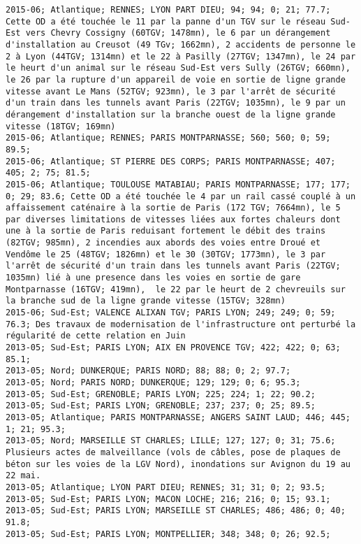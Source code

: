 \documentclass{article}
\begin{document}
\begin{Verbatim}[commandchars=\\\{\}]
2015-06; Atlantique; RENNES; LYON PART DIEU; 94; 94; 0; 21; 77.7; Cette OD a été touchée le 11 par la panne d'un TGV sur le réseau Sud-Est vers Chevry Cossigny (60TGV; 1478mn), le 6 par un dérangement d'installation au Creusot (49 TGv; 1662mn), 2 accidents de personne le 2 à Lyon (44TGV; 1314mn) et le 22 à Pasilly (27TGV; 1347mn), le 24 par le heurt d'un animal sur le réseau Sud-Est vers Sully (26TGV; 660mn), le 26 par la rupture d'un appareil de voie en sortie de ligne grande vitesse avant Le Mans (52TGV; 923mn), le 3 par l'arrêt de sécurité d'un train dans les tunnels avant Paris (22TGV; 1035mn), le 9 par un dérangement d'installation sur la branche ouest de la ligne grande vitesse (18TGV; 169mn)
2015-06; Atlantique; RENNES; PARIS MONTPARNASSE; 560; 560; 0; 59; 89.5; 
2015-06; Atlantique; ST PIERRE DES CORPS; PARIS MONTPARNASSE; 407; 405; 2; 75; 81.5; 
2015-06; Atlantique; TOULOUSE MATABIAU; PARIS MONTPARNASSE; 177; 177; 0; 29; 83.6; Cette OD a été touchée le 4 par un rail cassé couplé à un affaissement caténaire à la sortie de Paris (172 TGV; 7664mn), le 5 par diverses limitations de vitesses liées aux fortes chaleurs dont une à la sortie de Paris reduisant fortement le débit des trains (82TGV; 985mn), 2 incendies aux abords des voies entre Droué et Vendôme le 25 (48TGV; 1826mn) et le 30 (30TGV; 1773mn), le 3 par l'arrêt de sécurité d'un train dans les tunnels avant Paris (22TGV; 1035mn) lié à une presence dans les voies en sortie de gare Montparnasse (16TGV; 419mn),  le 22 par le heurt de 2 chevreuils sur la branche sud de la ligne grande vitesse (15TGV; 328mn)
2015-06; Sud-Est; VALENCE ALIXAN TGV; PARIS LYON; 249; 249; 0; 59; 76.3; Des travaux de modernisation de l'infrastructure ont perturbé la régularité de cette relation en Juin
2013-05; Sud-Est; PARIS LYON; AIX EN PROVENCE TGV; 422; 422; 0; 63; 85.1; 
2013-05; Nord; DUNKERQUE; PARIS NORD; 88; 88; 0; 2; 97.7; 
2013-05; Nord; PARIS NORD; DUNKERQUE; 129; 129; 0; 6; 95.3; 
2013-05; Sud-Est; GRENOBLE; PARIS LYON; 225; 224; 1; 22; 90.2; 
2013-05; Sud-Est; PARIS LYON; GRENOBLE; 237; 237; 0; 25; 89.5; 
2013-05; Atlantique; PARIS MONTPARNASSE; ANGERS SAINT LAUD; 446; 445; 1; 21; 95.3; 
2013-05; Nord; MARSEILLE ST CHARLES; LILLE; 127; 127; 0; 31; 75.6; Plusieurs actes de malveillance (vols de câbles, pose de plaques de béton sur les voies de la LGV Nord), inondations sur Avignon du 19 au 22 mai.
2013-05; Atlantique; LYON PART DIEU; RENNES; 31; 31; 0; 2; 93.5; 
2013-05; Sud-Est; PARIS LYON; MACON LOCHE; 216; 216; 0; 15; 93.1; 
2013-05; Sud-Est; PARIS LYON; MARSEILLE ST CHARLES; 486; 486; 0; 40; 91.8; 
2013-05; Sud-Est; PARIS LYON; MONTPELLIER; 348; 348; 0; 26; 92.5; 

\end{Verbatim}
\end{document}
